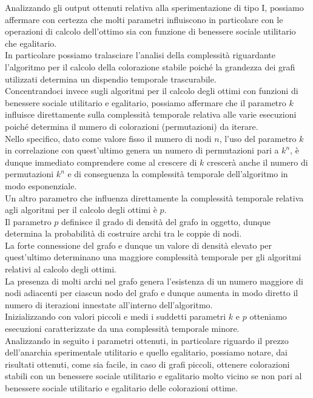 Analizzando gli output ottenuti relativa alla sperimentazione di tipo I, possiamo affermare con certezza che molti parametri influiscono in particolare con le operazioni di calcolo dell'ottimo sia con funzione di benessere sociale utilitario che egalitario.\\
In particolare possiamo tralasciare l'analisi della complessità riguardante l'algoritmo per il calcolo della colorazione stabile poiché la grandezza dei grafi utilizzati determina un dispendio temporale trascurabile.\\

Concentrandoci invece sugli algoritmi per il calcolo degli ottimi con funzioni di benessere sociale utilitario e egalitario, possiamo affermare che il parametro $k$ influisce direttamente sulla complessità temporale relativa alle varie esecuzioni poiché determina il numero di colorazioni (permutazioni) da iterare.\\

Nello specifico, dato come valore fisso il numero di nodi $n$, l'uso del parametro $k$ in correlazione con quest'ultimo genera un numero di permutazioni pari a \(k^n\), è dunque immediato comprendere come al crescere di $k$ crescerà anche il numero di permutazioni \(k^n\) e di conseguenza la complessità temporale dell'algoritmo in modo esponenziale.\\

Un altro parametro che influenza direttamente la complessità temporale relativa agli algoritmi per il calcolo degli ottimi è $p$.\\
Il parametro $p$ definisce il grado di densità del grafo in oggetto, dunque determina la probabilità di costruire archi tra le coppie di nodi.\\
La forte connessione del grafo e dunque un valore di densità elevato per quest'ultimo determinano una maggiore complessità temporale per gli algoritmi relativi al calcolo degli ottimi.\\
La presenza di molti archi nel grafo genera l'esistenza di un numero maggiore di nodi adiacenti per ciascun nodo del grafo e dunque aumenta in modo diretto il numero di iterazioni innestate all'interno dell'algoritmo.\\

Inizializzando con valori piccoli e medi i suddetti parametri $k$ e $p$ otteniamo esecuzioni caratterizzate da una complessità temporale minore.\\

Analizzando in seguito i parametri ottenuti, in particolare riguardo il prezzo dell'anarchia sperimentale utilitario e quello egalitario, possiamo notare, dai risultati ottenuti, come sia facile, in caso di grafi piccoli, ottenere colorazioni stabili con un benessere sociale utilitario e egalitario molto vicino se non pari al benessere sociale utilitario e egalitario delle colorazioni ottime.\\

